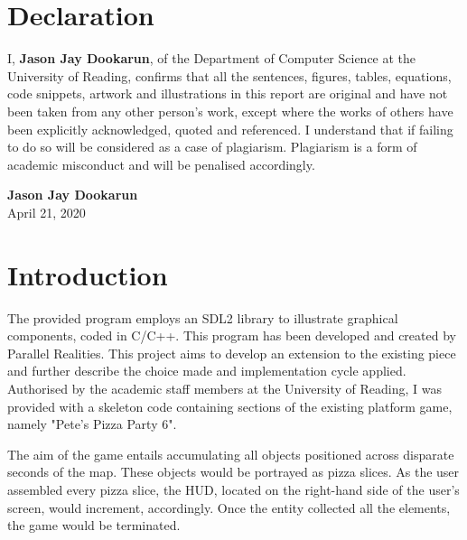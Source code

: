 \documentclass{article}
\begin{document}
\section*{Declaration}

I, \textbf{Jason Jay Dookarun}, of the Department of Computer Science at the University of Reading, confirms that all the sentences, figures, tables, equations, code snippets, artwork and illustrations in this report are original and have not been taken from any other person’s work, except where the works of others have been explicitly acknowledged, quoted and referenced. I understand that if failing to do so will be considered as a case of plagiarism. Plagiarism is a form of academic misconduct and will be penalised accordingly.

    \begin{flushright}
    \textbf{Jason Jay Dookarun} \\
    April 21, 2020\\
    [2cm]
    \end{flushright}

\tableofcontents
\thispagestyle{empty}
\cleardoublepage






\newpage
\section{Introduction}\label{sec:intro}
The provided program employs an SDL2 library to illustrate graphical components, coded in C/C++. This program has been developed and created by Parallel Realities. This project aims to develop an extension to the existing piece and further describe the choice made and implementation cycle applied. Authorised by the academic staff members at the University of Reading, I was provided with a skeleton code containing sections of the existing platform game, namely "Pete's Pizza Party 6".

The aim of the game entails accumulating all objects positioned across disparate seconds of the map. These objects would be portrayed as pizza slices. As the user assembled every pizza slice, the HUD, located on the right-hand side of the user's screen, would increment, accordingly. Once the entity collected all the elements, the game would be terminated.
\end{document}
